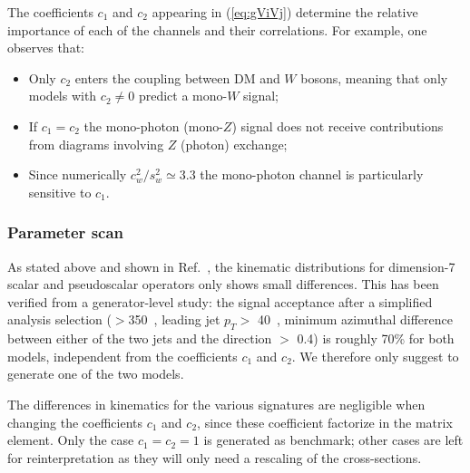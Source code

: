 %
%

The coefficients $c_1$ and $c_2$ appearing in (\ref{eq:gViVj}) determine the relative importance of each of the \MET channels and their correlations. For example, one observes that:
\begin{itemize}
 \item Only $c_2$ enters the coupling between DM and $W$ bosons, meaning that only models with $c_2 \neq 0$ predict a mono-$W$ signal;
 \item If $c_1 = c_2$ the mono-photon (mono-$Z$) signal does not receive contributions from diagrams involving $Z$ (photon) exchange;
  \item Since numerically $c_w^2/s_w^2 \simeq 3.3$ the mono-photon channel is particularly sensitive to $c_1$.
\end{itemize}

\subsubsection{Parameter scan}

As stated above and shown in Ref.~\cite{Nelson:2013pqa}, 
the kinematic distributions for dimension-7 scalar and pseudoscalar operators
only shows small differences. This has been verified from a generator-level study:
the signal acceptance after a simplified analysis selection 
(\MET$>$350~\gev, leading jet $p_T > $ 40~\gev, minimum azimuthal difference between
either of the two jets and the \MET direction $>$ 0.4) is roughly 70\% for both models, independent from the coefficients $c_1$ and $c_2$. 
We therefore only suggest to generate one of the two models.


The differences in kinematics for the various signatures
are negligible when changing the coefficients $c_1$ and $c_2$, 
since these coefficient factorize in the matrix element. 
Only the case $c_1=c_2=1$ is generated as benchmark;
other cases are left for reinterpretation as they will only need a 
rescaling of the cross-sections. 

